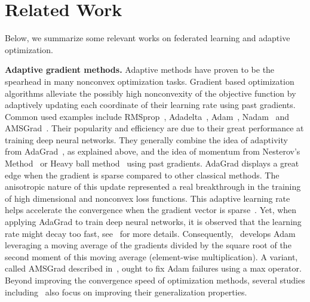 \documentclass[manuscript,screen,review]{acmart}
\begin{document}
\section{Related Work}\label{sec:related}

Below, we summarize some relevant works on federated learning and adaptive optimization.

\vspace{0.1in}
\noindent\textbf{Adaptive gradient methods.}
Adaptive methods have proven to be the spearhead in many nonconvex optimization tasks.
Gradient based optimization algorithms alleviate the possibly high nonconvexity of the objective function by adaptively updating each coordinate of their learning rate using past gradients. 
Common used examples include RMSprop~\citep{TH12}, Adadelta~\citep{Z12}, Adam~\citep{KB15}, Nadam~\citep{dozat2016incorporating} and AMSGrad~\citep{reddi2019convergence}.
Their popularity and efficiency are due to their great performance at training deep neural networks.
They generally combine the idea of adaptivity from AdaGrad~\citep{DHS11,mcmahan2010adaptive}, as explained above, and the idea of momentum from Nesterov's Method~\citep{N04} or Heavy ball method~\citep{P64} using past gradients.
AdaGrad displays a great edge when the gradient is sparse compared to other classical methods.
The anisotropic nature of this update represented a real breakthrough in the training of high dimensional and nonconvex loss functions.
This adaptive learning rate helps accelerate the convergence when the gradient vector is sparse~\citep{DHS11}. Yet, when applying AdaGrad to train deep neural networks, it is observed that the learning rate might decay too fast, see~\citet{KB15} for more details.
Consequently,~\cite{KB15} develops Adam leveraging a moving average of the gradients divided by the square root of the second moment of this moving average (element-wise multiplication).
A variant, called AMSGrad described in~\citet{reddi2019convergence}, ought to fix Adam failures using a max operator. Beyond improving the convergence speed of optimization methods, several studies including~\citet{zhou2020towards} also focus on improving their generalization properties.
\end{document}
